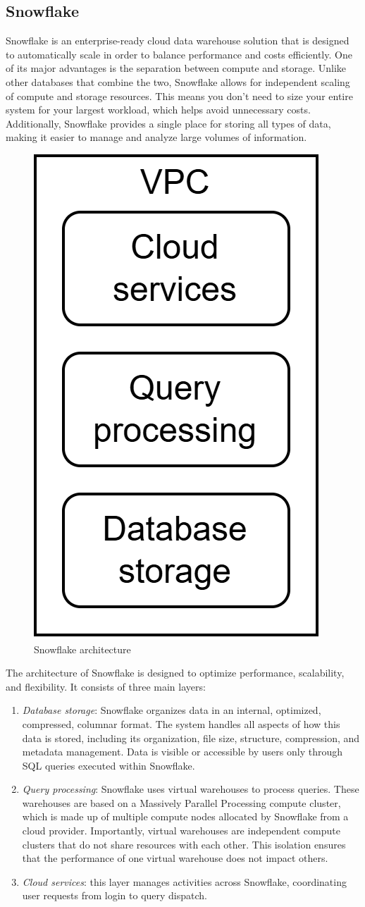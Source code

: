 \subsection{Snowflake}
Snowflake is an enterprise-ready cloud data warehouse solution that is designed to automatically scale in order to balance performance and costs efficiently. 
One of its major advantages is the separation between compute and storage. Unlike other databases that combine the two, Snowflake allows for independent scaling of compute and storage resources. 
This means you don't need to size your entire system for your largest workload, which helps avoid unnecessary costs.
Additionally, Snowflake provides a single place for storing all types of data, making it easier to manage and analyze large volumes of information.
\begin{figure}[H]
    \centering
    \includegraphics[width=0.25\linewidth]{images/arc.png}
    \caption{Snowflake architecture}
\end{figure}
The architecture of Snowflake is designed to optimize performance, scalability, and flexibility. It consists of three main layers:

\begin{enumerate}
    \item \textit{Database storage}: Snowflake organizes data in an internal, optimized, compressed, columnar format. 
        The system handles all aspects of how this data is stored, including its organization, file size, structure, compression, and metadata management. 
        Data is visible or accessible by users only through SQL queries executed within Snowflake.
    \item \textit{Query processing}: Snowflake uses virtual warehouses to process queries. 
        These warehouses are based on a Massively Parallel Processing compute cluster, which is made up of multiple compute nodes allocated by Snowflake from a cloud provider. 
        Importantly, virtual warehouses are independent compute clusters that do not share resources with each other. This isolation ensures that the performance of one virtual warehouse does not impact others.
    \item \textit{Cloud services}: this layer manages activities across Snowflake, coordinating user requests from login to query dispatch.
\end{enumerate}

